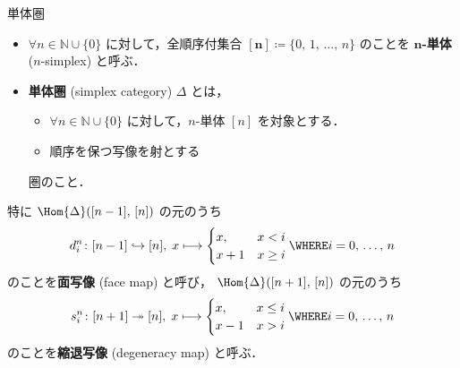 \documentclass[TQFT_main]{subfiles}
\begin{document}
\begin{mydef}[label=def:simplex-cat,breakable]{単体圏}
    \begin{itemize}
        \item $\forall n \in \mathbb{N} \cup \{0\}$ に対して，全順序付集合 $\bm{[n]} \coloneqq \{0,\, 1,\, \dots,\, n\}$ のことを $\bm{n}$\textbf{-単体} ($n$-simplex) と呼ぶ．
        \item \textbf{単体圏} (simplex category) $\Delta$ とは，
        \begin{itemize}
            \item $\forall n \in \mathbb{N} \cup \{0\}$ に対して，$n$-単体 $[n]$ を対象とする．
            \item 順序を保つ写像を射とする
        \end{itemize}
        圏のこと．
    \end{itemize}
    
    \tcblower

    特に $\Hom{\Delta} ([n-1],\, [n])$ の元のうち
    \begin{align}
        d^n_i \colon [n-1] \hookrightarrow [n],\; x \lmto 
        \begin{cases}
            x, &x < i \\
            x+1 &x \ge i
        \end{cases}
        \WHERE i = 0,\, \dots,\, n
    \end{align}
    のことを\textbf{面写像} (face map) と呼び，
    $\Hom{\Delta}([n+1],\, [n])$ の元のうち
    \begin{align}
        s^n_i \colon [n+1] \twoheadrightarrow [n],\; x \lmto 
        \begin{cases}
            x, &x \le i \\
            x-1 &x > i
        \end{cases}
        \WHERE i=0,\, \dots,\, n
    \end{align}
    のことを\textbf{縮退写像} (degeneracy map) と呼ぶ．
\end{mydef}
\end{document}
